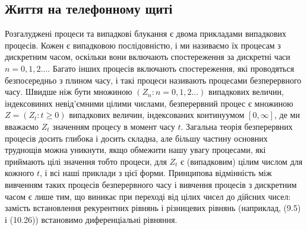 \documentclass[12pt,fleqn]{article}
\numberwithin{figure}{section}
\numberwithin{equation}{section}
\begin{document}
\subsection{Життя на телефонному щиті}\label{sub.11.1}
Розгалуджені процеси та випадкові блукання є двома прикладами випадкових процесів. Кожен є випадковою послідовністю, і ми називаємо їх процесам з дискретним часом, оскільки вони включають спостереження за дискретні часи $n=0,1,2\dots$. Багато інших процесів включають спостереження, які проводяться безпосередньо з плином часу, і такі процеси називають процесами безперервного часу. Швидше ніж бути множиною $(Z_n:n=0,1,2 \dots)$ випадкових величин, індексовиних невід'ємними цілими числами, безперервний процес є множиною $Z=(Z_t:t\geq 0)$ випадкових величин, індексованих континуумом $[0,\infty]$, де ми вважаємо $Z_t$ значенням процесу в момент часу $t$. Загальна теорія безперервних процесів досить глибока і досить складна, але більшу частину основних труднощів можна уникнути, якщо обмежити нашу увагу процесами, які приймають цілі значення тобто процеси, для $Z_t$ є (випадковим) цілим числом для кожного $t$, і всі наші приклади з цієї форми. Принципова відмінність між вивченням таких процесів безперервного часу і вивчення процесів з дискретним часом є лише тим, що виникає при переході від цілих чисел до дійсних чисел: замість встановлення рекурентних рівнянь і різницевих рівнянь (наприклад, (9.5) і (10.26)) встановимо диференціальні рівняння.
\end{document}
